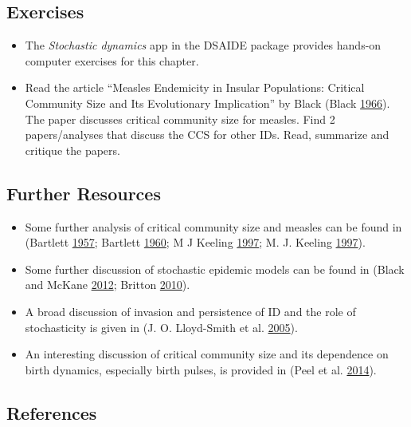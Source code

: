 \documentclass[]{article}
\providecommand{\tightlist}{%
  \setlength{\itemsep}{0pt}\setlength{\parskip}{0pt}}
\theoremstyle{definition}
\theoremstyle{definition}
\theoremstyle{definition}
\theoremstyle{remark}
\begin{document}
\subsection{Exercises}\label{exercises-11}

\begin{itemize}
\tightlist
\item
  The \emph{Stochastic dynamics} app in the DSAIDE package provides
  hands-on computer exercises for this chapter.
\item
  Read the article ``Measles Endemicity in Insular Populations: Critical
  Community Size and Its Evolutionary Implication'' by Black (Black
  \protect\hyperlink{ref-black66}{1966}). The paper discusses critical
  community size for measles. Find 2 papers/analyses that discuss the
  CCS for other IDs. Read, summarize and critique the papers.
\end{itemize}

\subsection{Further Resources}\label{further-resources-11}

\begin{itemize}
\tightlist
\item
  Some further analysis of critical community size and measles can be
  found in (Bartlett \protect\hyperlink{ref-bartlett57}{1957}; Bartlett
  \protect\hyperlink{ref-bartlett60}{1960}; M J Keeling
  \protect\hyperlink{ref-keeling97}{1997}; M. J. Keeling
  \protect\hyperlink{ref-keeling97a}{1997}).
\item
  Some further discussion of stochastic epidemic models can be found in
  (Black and McKane \protect\hyperlink{ref-black12}{2012}; Britton
  \protect\hyperlink{ref-britton10a}{2010}).
\item
  A broad discussion of invasion and persistence of ID and the role of
  stochasticity is given in (J. O. Lloyd-Smith et al.
  \protect\hyperlink{ref-lloyd-smith05b}{2005}).
\item
  An interesting discussion of critical community size and its
  dependence on birth dynamics, especially birth pulses, is provided in
  (Peel et al. \protect\hyperlink{ref-peel14}{2014}).
\end{itemize}

\subsection{References}\label{references-12}
\end{document}
